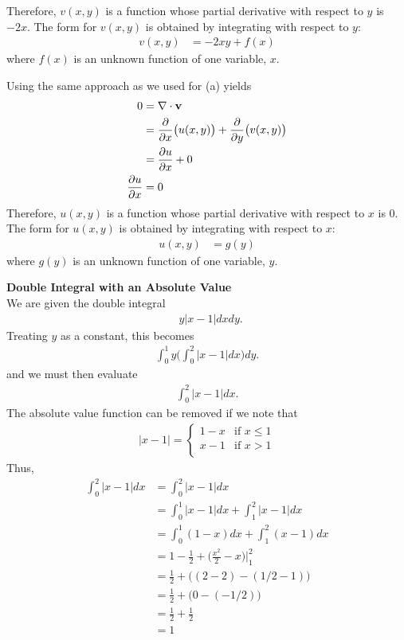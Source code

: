 Therefore, $v(x,y)$ is a function whose partial derivative with respect to $y$ is $-2x$. The  form for $v(x,y)$ is obtained by integrating with respect to $y$:
\begin{align*}
 v(x,y) &= -2xy + f(x)
\end{align*}
where $f(x)$ is an unknown function of one variable, $x$. 
\item Using the same approach as we used for (a) yields
\begin{align*}
  0&= \nabla \cdot \mathbf{v} \\
  &= \frac{\partial}{\partial x} \big(u(x,y)\big) + \frac{\partial}{\partial y} \big(v(x,y)\big) \\
  &=  \frac{\partial u}{\partial x}+ 0\\
   \frac{\partial u}{\partial x} &= 0
\end{align*}
Therefore, $u(x,y)$ is a function whose partial derivative with respect to $x$ is $0$. The  form for $u(x,y)$ is obtained by integrating with respect to $x$:
\begin{align*}
 u(x,y) &= g(y)
\end{align*}
where $g(y)$ is an unknown function of one variable, $y$. 
\EEN
\item %
\textbf{Double Integral with an Absolute Value}\\
We are given the double integral
\begin{align*}
  \mathop{\int_{0}^{1} \! \int_0^{2}  }y \big| x-1\big| dxdy.
\end{align*}
Treating $y$ as a constant, this becomes
\begin{align*}
  \int_{0}^{1} y \Bigg( \int_0^{2}   \big| x-1\big| dx\Bigg)dy.
\end{align*}
and we must then evaluate 
\begin{align*}
  \int_0^{2}   \big| x-1\big| dx.
\end{align*}
The absolute value function can be removed if we note that 
\begin{align*}
|x - 1| = \left\{
\begin{array}{rl}
1-x & \text{if } x \le 1\\
x-1 & \text{if } x > 1\\
\end{array} \right.
\end{align*}
Thus, 
\begin{align*}
  \int_0^{2}   \big| x-1\big| dx 
  &=  \int_0^{2}   \big| x-1\big| dx \\
  &=  \int_0^{1}   \big| x-1\big| dx +  \int_1^{2}   \big| x-1\big| dx \\
  &=  \int_0^{1}  ( 1 - x ) dx +  \int_1^{2}   (x - 1) dx \\
  &=  1 - \frac{1}{2} +    \Big(\frac{x^2}{2} - x\Big)\Big|_1^{2} \\
  &=  \frac{1}{2} +    \Big((2-2) - (1/2-1)\Big) \\
  &=  \frac{1}{2} +    \Big(0 - (-1/2)\Big) \\
  &=  \frac{1}{2} + \frac{1}{2}\\
  &= 1
\end{align*}

